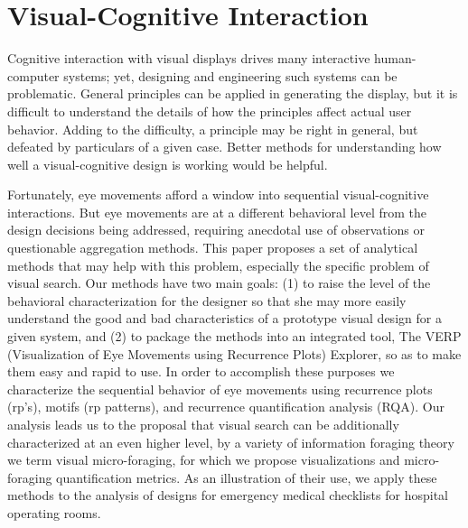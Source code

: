 \documentclass{sigchi}
\begin{document}


\section{Visual-Cognitive Interaction} Cognitive interaction with visual
displays drives many interactive human-computer systems; yet, designing and
engineering such systems can be problematic. General principles can be
applied in generating the display, but it is difficult to  understand the
details of how the principles affect actual user behavior. Adding to the
difficulty, a principle may be right in general, but defeated by
particulars of a given case. Better methods for understanding how well a
visual-cognitive design is working would be helpful. 

Fortunately, eye movements afford a window into sequential visual-cognitive
interactions. But eye movements are at a different behavioral level from
the design decisions being addressed, requiring anecdotal use of
observations or questionable aggregation methods. This paper proposes a set
of analytical methods that may help with this problem, especially the
specific problem of visual search. Our methods have two main goals: (1) to
raise the level of the behavioral characterization for the designer so that
she may more easily understand the good and bad characteristics of a
prototype visual design for a given system, and (2) to package the methods
into an integrated tool, The VERP (Visualization of Eye Movements using
Recurrence Plots) Explorer, so as to make them easy and rapid to use. In
order to accomplish these purposes we characterize the sequential behavior of
eye movements using recurrence plots (rp's), 
motifs (rp patterns), and recurrence quantification analysis (RQA). Our analysis leads us to
the proposal that visual search can be additionally characterized at an even
higher level, by a variety of information foraging theory we term visual
micro-foraging, for which we propose visualizations and micro-foraging
quantification metrics. As an illustration of their use, we apply these
methods to the analysis of designs for emergency medical checklists for
hospital operating rooms.
\end{document}
